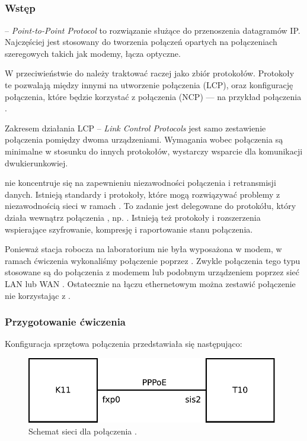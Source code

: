 \subsection{\ppp}


\subsubsection{Wstęp}

\ppp{} -- \emph{Point-to-Point Protocol} to rozwiązanie służące do
przenoszenia datagramów IP. Najczęściej jest stosowany do tworzenia połączeń
opartych na połączeniach szeregowych takich jak modemy, łącza
optyczne\cite{ppp:stevens-ppp}.

W przeciwieństwie do \arp{} \ppp{} należy traktować raczej jako zbiór
protokołów. Protokoły te pozwalają między innymi na utworzenie połączenia
\ppp{} (LCP), oraz konfigurację połączenia, które będzie korzystać z
połączenia \ppp{} (NCP) --- na przykład połączenia \ip.

Zakresem działania LCP -- \emph{Link Control Protocols} jest samo zestawienie
połączenia pomiędzy dwoma urządzeniami. Wymagania wobec połączenia są
minimalne w stosunku do innych protokołów, wystarczy wsparcie dla komunikacji
dwukierunkowiej.

\ppp{} nie koncentruje się na zapewnieniu niezawodności połączenia i
retransmisji danych. Istnieją standardy i protokoły, które mogą rozwiązywać
problemy z niezawodnością sieci w ramach \ppp{}. To zadanie jest delegowane do
protokółu, który działa wewnątrz połączenia \ppp{}, np. \ip{}. Istnieją też
protokoły i rozszerzenia \ppp{} wspierające szyfrowanie, kompresję i
raportowanie stanu połączenia.

Ponieważ stacja robocza na laboratorium nie była wyposażona w modem, w ramach
ćwiczenia \ppp{} wykonaliśmy połączenie \tcp{} poprzez \pppoe{}. Zwykle
połączenia tego typu stosowane są do połączenia z modemem lub podobnym
urządzeniem poprzez sieć LAN lub WAN \cite{ppp:stevens-pppoe}. Ostatecznie na
łączu ethernetowym można zestawić połączenie \tcp{} nie korzystając z \ppp{}.


\subsubsection{Przygotowanie ćwiczenia}

Konfiguracja sprzętowa połączenia przedstawiała się następująco:

\begin{figure}[h!]
  \centering
  \includegraphics[width=11cm]{figury/ppp/schemat-przed.pdf}
  \caption{Schemat sieci dla połączenia \ppp.}
  \label{fig:ppp:schemat-sieci-przed}
\end{figure}

